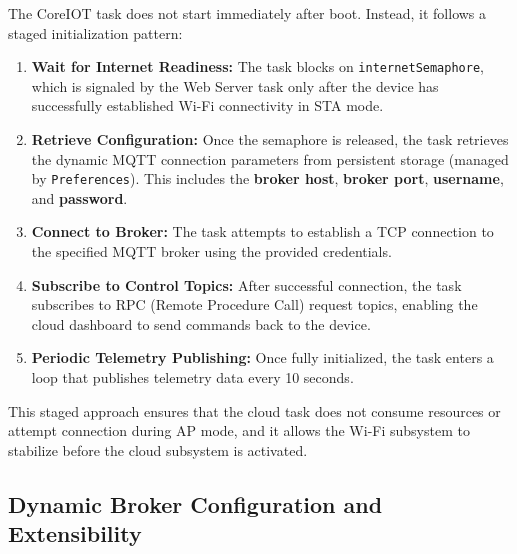 The CoreIOT task does not start immediately after boot. Instead, it follows a staged initialization pattern:
\begin{enumerate}
  \item \textbf{Wait for Internet Readiness:} The task blocks on \texttt{internetSemaphore}, which is signaled by the Web Server task only after the device has successfully established Wi-Fi connectivity in STA mode.
  \item \textbf{Retrieve Configuration:} Once the semaphore is released, the task retrieves the dynamic MQTT connection parameters from persistent storage (managed by \texttt{Preferences}). This includes the \textbf{broker host}, \textbf{broker port}, \textbf{username}, and \textbf{password}.
  \item \textbf{Connect to Broker:} The task attempts to establish a TCP connection to the specified MQTT broker using the provided credentials.
  \item \textbf{Subscribe to Control Topics:} After successful connection, the task subscribes to RPC (Remote Procedure Call) request topics, enabling the cloud dashboard to send commands back to the device.
  \item \textbf{Periodic Telemetry Publishing:} Once fully initialized, the task enters a loop that publishes telemetry data every 10 seconds.
\end{enumerate}

This staged approach ensures that the cloud task does not consume resources or attempt connection during AP mode, and it allows the Wi-Fi subsystem to stabilize before the cloud subsystem is activated.

\subsection*{Dynamic Broker Configuration and Extensibility}


